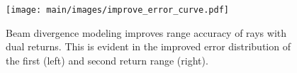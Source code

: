 \begin{figure}[t]
    \centering
        \texttt{[image: main/images/improve\_error\_curve.pdf]}
        \caption{Beam divergence modeling improves range accuracy of rays with dual returns. This is evident in the improved error distribution of the first (left) and second return range (right).}
    \label{fig:iccv_ecdf}
\end{figure}